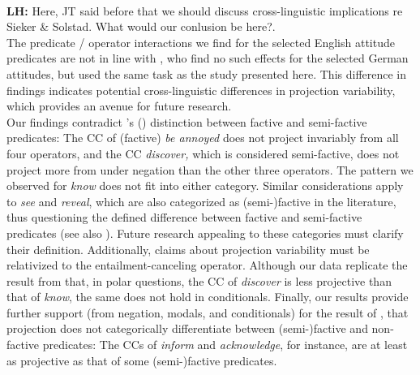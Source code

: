 \documentclass[12pt, a4paper]{article}
\newcommand{\posscite}[1]{\citeauthor{#1}'s (\citeyear{#1})}
\begin{document}
 \\
	\noindent
	{\bfseries LH: } Here, JT said before that we should discuss cross-linguistic implications re Sieker \& Solstad. What would our conlusion be here?.\\

	The predicate / operator interactions we find for the selected English attitude predicates are not in line with \cite{sieker_projective_2022}, who find no such effects for the selected German attitudes, but used the same task as the study presented here. This difference in findings indicates potential cross-linguistic differences in projection variability, which provides an avenue for future research.\\

	Our findings contradict \posscite{karttunen_observations_1971} distinction between factive and semi-factive predicates: The CC of (factive) \emph{be annoyed} does not project invariably from all four operators, and the CC \emph{discover,}  which is considered semi-factive, does not project more from under negation than the other three operators. The pattern we observed for {\em know} does not fit into either category. Similar considerations apply to \emph{see} and \emph{reveal}, which are also categorized as (semi-)factive in the literature, thus questioning the defined difference between factive and semi-factive predicates (see also \citealp{beaver_have_2010}). Future research appealing to these categories must clarify their definition. Additionally, claims about projection variability must be relativized to the entailment-canceling operator. Although our data replicate the result from \citet{tonhauser_how_2018} that, in polar questions, the CC of \emph{discover} is less projective than that of \emph{know}, the same does not hold in conditionals. Finally, our results provide further support (from negation, modals, and conditionals) for the result of \citet{degen_are_2022}, that projection does not categorically differentiate between (semi-)factive and non-factive predicates: The CCs of \emph{inform} and \emph{acknowledge}, for instance, are at least as projective as that of some (semi-)factive predicates.
	
\end{document}
